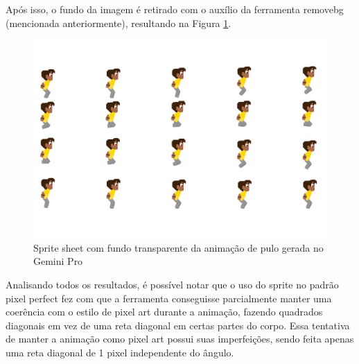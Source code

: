 Após isso, o fundo da imagem é retirado com o auxílio da ferramenta removebg (mencionada anteriormente), resultando na Figura \ref{fig:geminiProPularSpriteSheetTransparente}.

\begin{figure}[htbp]
    \centering
    \caption{\small Sprite sheet com fundo transparente da animação de pulo gerada no Gemini Pro}
    \label{fig:geminiProPularSpriteSheetTransparente}
    \includegraphics[width=0.8\linewidth]{figs/geminiPro/sprite sheet/jump_transparente.png}
\end{figure}

Analisando todos os resultados, é possível notar que o uso do sprite no padrão pixel perfect fez com que a ferramenta conseguisse parcialmente manter uma coerência com o estilo de pixel art durante a animação, fazendo quadrados diagonais em vez de uma reta diagonal em certas partes do corpo. Essa tentativa de manter a animação como pixel art possui suas imperfeições, sendo feita apenas uma reta diagonal de 1 pixel independente do ângulo. 

